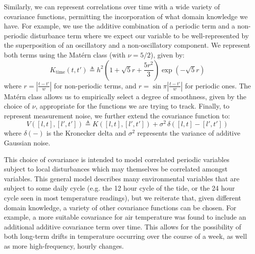 \documentclass{acmtrans2m}
\newcommand{\dd}[2]{\delta\!\left(#1-#2\right)}
\newcommand{\defequal}{\triangleq}
\begin{document}
Similarly, we can represent correlations over time with a wide variety of covariance functions, permitting the incorporation of what domain knowledge we have. For example, we use the additive combination of a periodic term and a non-periodic disturbance term where we expect our variable to be well-represented by the superposition of an oscillatory and a non-oscillatory component. We represent both terms using the Mat\'{e}rn class \cite{GPsBook} (with $\nu=5/2$), given by:
\begin{equation}
K_\text{time}(t,t') \defequal h^2 \left(1+\sqrt{5}r+\frac{5r^2}{3}\right)\exp\left(-\sqrt{5}r\right)
\end{equation}
where $r = \left|\frac{t-t'}{w}\right|$ for non-periodic terms, and $r = \sin \pi \left|\frac{t-t'}{w}\right|$ for periodic ones. The Mat\'{e}rn class allows us to empirically select a degree of smoothness, given by the choice of $\nu$, appropriate for the functions we are trying to track. Finally, to represent measurement noise, we further extend the covariance function to:
\small\begin{equation}
V([l,t],[l',t'])\defequal K([l,t],[l',t'])+ \sigma^2\,\dd{[l,t]}{[l',t']}
\end{equation}\normalsize
where $\dd{}{}$ is the Kronecker delta and $\sigma^2$ represents the variance of additive Gaussian noise.

This choice of covariance is intended to model correlated periodic variables subject to local disturbances which may themselves be correlated amongst variables. This general model describes many environmental variables that are subject to some daily cycle (e.g. the 12 hour cycle of the tide, or the 24 hour cycle seen in most temperature readings), but we reiterate that, given different domain knowledge, a variety of other covariance functions can be chosen. For example, a more suitable covariance for air temperature was found to include an additional additive covariance term over time. This allows for the possibility of both long-term drifts in temperature occurring over the course of a week, as well as more high-frequency, hourly changes.
\end{document}
